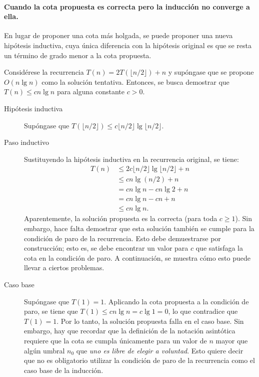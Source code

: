 \paragraph{Cuando la cota propuesta es correcta pero la inducción no converge a ella.}
{%
  En lugar de proponer una cota más holgada, se puede proponer una nueva hipótesis inductiva, cuya única diferencia con la hipótesis original es que se resta un término de grado menor a la cota propuesta.
}

\begin{expl}
  \label{ex:recurrence_substitution}
  Considérese la recurrencia \(T(n)=2T(\lfloor n/2 \rfloor)+n\) y supóngase que se propone \(O(n\lg{n})\) como la solución tentativa. 
  Entonces, se busca demostrar que \(T(n)\leq cn\lg{n}\) para alguna constante \(c>0\).
  \begin{description}
    \item[Hipótesis inductiva] Supóngase que \(T(\lfloor n/2\rfloor)\leq c\lfloor n/2\rfloor\lg\lfloor n/2\rfloor\).
    \item[Paso inductivo] Sustituyendo la hipótesis inductiva en la recurrencia original, se tiene:
    \begin{align*}
      T(n) &\leq2c\lfloor n/2\rfloor\lg\lfloor n/2\rfloor+n \\
      &\leq cn\lg(n/2)+n \\
      &=cn\lg n-cn\lg2+n \\
      &=cn\lg{n}-cn+n \\
      &\leq cn\lg n.
    \end{align*}
    Aparentemente, la solución propuesta es la correcta (para toda \(c\geq 1\)). 
    Sin embargo, hace falta demostrar que esta solución también se cumple para la condición de paro de la recurrencia. 
    Esto debe demuestrarse por construcción; esto es, se debe encontrar un valor para \(c\) que satisfaga la cota en la condición de paro. 
    A continuación, se muestra cómo esto puede llevar a ciertos problemas. 
    \item[Caso base] Supóngase que \(T(1)=1\). 
    Aplicando la cota propuesta a la condición de paro, se tiene que \(T(1)\leq cn\lg n=c\lg{1}=0\), lo que contradice que \(T(1)=1\). 
    Por lo tanto, la solución propuesta falla en el caso base. 
    Sin embargo, hay que recordar que la definición de la notación asintótica requiere que la cota se cumpla únicamente para un valor de \(n\) mayor que algún umbral \(n_{0}\) que \emph{uno es libre de elegir a voluntad}. 
    Esto quiere decir que no es obligatorio utilizar la condición de paro de la recurrencia como el caso base de la inducción. 

\end{description}
\end{expl}
